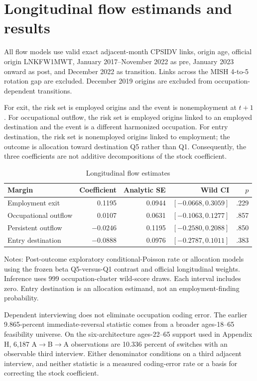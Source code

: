 \section{Longitudinal flow estimands and results}\label{app:flows}

All flow models use valid exact adjacent-month CPSIDV links, origin age, official origin LNKFW1MWT, January 2017--November 2022 as pre, January 2023 onward as post, and December 2022 as transition. Links across the MISH 4-to-5 rotation gap are excluded. December 2019 origins are excluded from occupation-dependent transitions.

For exit, the risk set is employed origins and the event is nonemployment at $t+1$. For occupational outflow, the risk set is employed origins linked to an employed destination and the event is a different harmonized occupation. For entry destination, the risk set is nonemployed origins linked to employment; the outcome is allocation toward destination Q5 rather than Q1. Consequently, the three coefficients are not additive decompositions of the stock coefficient.

\begin{table}[htbp]
\centering
\caption{Longitudinal flow estimates}
\label{tab:app-flows}
\begin{threeparttable}
\begin{tabular}{lrrrr}
\toprule
Margin & Coefficient & Analytic SE & Wild CI & $p$\\
\midrule
Employment exit & 0.1195 & 0.0944 & $[-0.0668,0.3059]$ & .229\\
Occupational outflow & 0.0107 & 0.0631 & $[-0.1063,0.1277]$ & .857\\
Persistent outflow & $-0.0246$ & 0.1195 & $[-0.2580,0.2088]$ & .850\\
Entry destination & $-0.0888$ & 0.0976 & $[-0.2787,0.1011]$ & .383\\
\bottomrule
\end{tabular}
\begin{tablenotes}[flushleft]\footnotesize
\item Notes: Post-outcome exploratory conditional-Poisson rate or allocation models using the frozen beta Q5-versus-Q1 contrast and official longitudinal weights. Inference uses 999 occupation-cluster wild-score draws. Each interval includes zero. Entry destination is an allocation estimand, not an employment-finding probability.
\end{tablenotes}
\end{threeparttable}
\end{table}

Dependent interviewing does not eliminate occupation coding error. The earlier
9.865-percent immediate-reversal statistic comes from a broader ages-18--65
feasibility universe.  On the six-architecture ages-22--65 support used in
Appendix H, 6,187 A$\rightarrow$B$\rightarrow$A observations are 10.336 percent
of switches with an observable third interview.  Either denominator conditions
on a third adjacent interview, and neither statistic is a measured coding-error
rate or a basis for correcting the stock coefficient.
